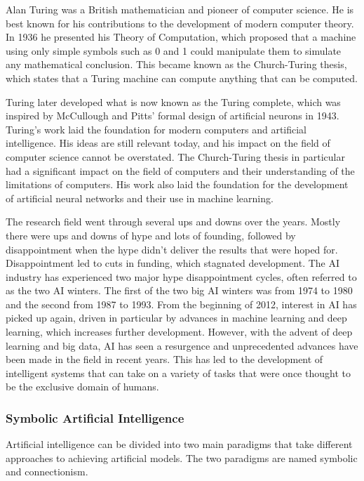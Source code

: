 Alan Turing was a British mathematician and pioneer of computer science. He is best known for his contributions to the development of modern computer theory. In 1936 he presented his Theory of Computation, which proposed that a machine using only simple symbols such as 0 and 1 could manipulate them to simulate any mathematical conclusion. This became known as the Church-Turing thesis, which states that a Turing machine can compute anything that can be computed. 

Turing later developed what is now known as the Turing complete, which was inspired by McCullough and Pitts' formal design of artificial neurons in 1943. Turing's work laid the foundation for modern computers and artificial intelligence. His ideas are still relevant today, and his impact on the field of computer science cannot be overstated. The Church-Turing thesis in particular had a significant impact on the field of computers and their understanding of the limitations of computers. His work also laid the foundation for the development of artificial neural networks and their use in machine learning.

The research field went through several ups and downs over the years. Mostly there were ups and downs of hype and lots of founding, followed by disappointment when the hype didn't deliver the results that were hoped for. Disappointment led to cuts in funding, which stagnated development. The AI industry has experienced two major hype disappointment cycles, often referred to as the two AI winters. The first of the two big AI winters was from 1974 to 1980 and the second from 1987 to 1993. From the beginning of 2012, interest in AI has picked up again, driven in particular by advances in machine learning and deep learning, which increases further development. However, with the advent of deep learning and big data, AI has seen a resurgence and unprecedented advances have been made in the field in recent years. This has led to the development of intelligent systems that can take on a variety of tasks that were once thought to be the exclusive domain of humans. 


\subsubsection{Symbolic Artificial Intelligence}
Artificial intelligence can be divided into two main paradigms that take different approaches to achieving artificial models. The two paradigms are named symbolic and connectionism.


